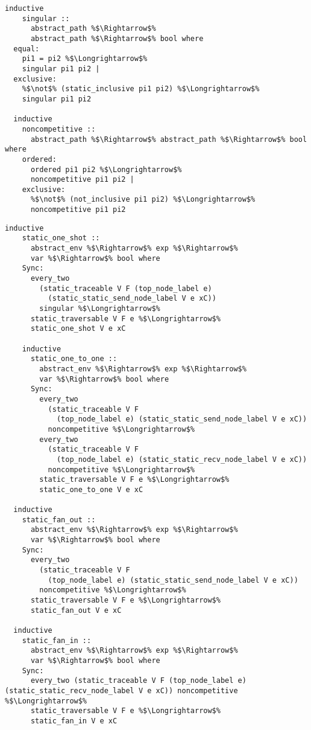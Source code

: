 \documentclass{article}
\begin{document}
\begin{lstlisting}[style=codestyle1, escapechar=\%]
  inductive
    singular ::
      abstract_path %$\Rightarrow$%
      abstract_path %$\Rightarrow$% bool where
  equal:
    pi1 = pi2 %$\Longrightarrow$% 
    singular pi1 pi2 |
  exclusive:
    %$\not$% (static_inclusive pi1 pi2) %$\Longrightarrow$% 
    singular pi1 pi2

  inductive
    noncompetitive ::
      abstract_path %$\Rightarrow$% abstract_path %$\Rightarrow$% bool where
    ordered:
      ordered pi1 pi2 %$\Longrightarrow$% 
      noncompetitive pi1 pi2 |
    exclusive:
      %$\not$% (not_inclusive pi1 pi2) %$\Longrightarrow$% 
      noncompetitive pi1 pi2
  \end{lstlisting}

\begin{lstlisting}[style=codestyle1, escapechar=\%]
  inductive
    static_one_shot ::
      abstract_env %$\Rightarrow$% exp %$\Rightarrow$%
      var %$\Rightarrow$% bool where
    Sync:
      every_two
        (static_traceable V F (top_node_label e)
          (static_static_send_node_label V e xC))
        singular %$\Longrightarrow$%
      static_traversable V F e %$\Longrightarrow$%
      static_one_shot V e xC 

    inductive
      static_one_to_one ::
        abstract_env %$\Rightarrow$% exp %$\Rightarrow$%
        var %$\Rightarrow$% bool where
      Sync:
        every_two
          (static_traceable V F
            (top_node_label e) (static_static_send_node_label V e xC))
          noncompetitive %$\Longrightarrow$%
        every_two
          (static_traceable V F
            (top_node_label e) (static_static_recv_node_label V e xC))
          noncompetitive %$\Longrightarrow$%
        static_traversable V F e %$\Longrightarrow$%
        static_one_to_one V e xC 

  inductive
    static_fan_out ::
      abstract_env %$\Rightarrow$% exp %$\Rightarrow$%
      var %$\Rightarrow$% bool where
    Sync:
      every_two
        (static_traceable V F
          (top_node_label e) (static_static_send_node_label V e xC))
        noncompetitive %$\Longrightarrow$%
      static_traversable V F e %$\Longrightarrow$%
      static_fan_out V e xC 

  inductive
    static_fan_in ::
      abstract_env %$\Rightarrow$% exp %$\Rightarrow$%
      var %$\Rightarrow$% bool where
    Sync:
      every_two (static_traceable V F (top_node_label e) (static_static_recv_node_label V e xC)) noncompetitive %$\Longrightarrow$%
      static_traversable V F e %$\Longrightarrow$%
      static_fan_in V e xC

    \end{lstlisting}
\end{document}
